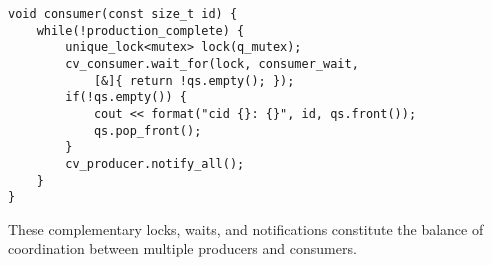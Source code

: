 \begin{lstlisting}[style=styleCXX]
void consumer(const size_t id) {
	while(!production_complete) {
		unique_lock<mutex> lock(q_mutex);
		cv_consumer.wait_for(lock, consumer_wait,
			[&]{ return !qs.empty(); });
		if(!qs.empty()) {
			cout << format("cid {}: {}", id, qs.front());
			qs.pop_front();
		}
		cv_producer.notify_all();
	}
}
\end{lstlisting}

These complementary locks, waits, and notifications constitute the balance of coordination between multiple producers and consumers.








